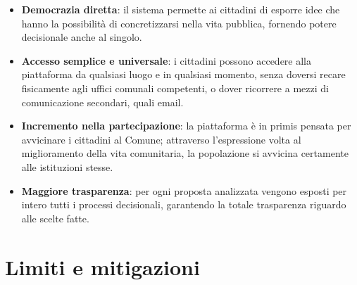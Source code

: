 \begin{itemize}
  
  	\item \textbf{Democrazia diretta}: il sistema permette ai cittadini di esporre idee che hanno la possibilità di concretizzarsi nella vita pubblica, fornendo potere decisionale anche al singolo.
  	
	  \item \textbf{Accesso semplice e universale}: i cittadini possono accedere alla piattaforma da qualsiasi luogo e in qualsiasi momento, senza doversi recare fisicamente agli uffici comunali competenti, o dover ricorrere a mezzi di comunicazione secondari, quali email.
	  
    \item \textbf{Incremento nella partecipazione}: la piattaforma è in primis pensata per avvicinare i cittadini al Comune; attraverso l'espressione volta al miglioramento della vita comunitaria, la popolazione si avvicina certamente alle istituzioni stesse.

  \item \textbf{Maggiore trasparenza}: per ogni proposta analizzata vengono esposti per intero tutti i processi decisionali, garantendo la totale trasparenza riguardo alle scelte fatte.
  
\end{itemize}

\section{Limiti e mitigazioni}

